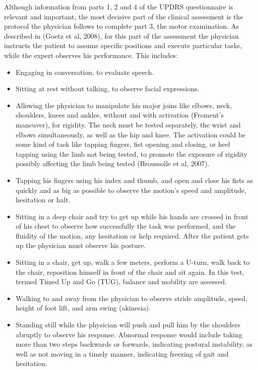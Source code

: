 Although information from parts 1, 2 and 4 of the U\gls{PD}RS questionnaire is relevant and important, the most decisive part of the clinical assessment is the protocol the physician follows to complete part 3, the motor examination. As described in (Goetz et al, 2008), for this part of the assessment the physician instructs the patient to assume specific positions and execute particular tasks, while the expert observes his performance. This includes:
\begin{itemize}
\item Engaging in conversation, to evaluate speech.
\item Sitting at rest without talking, to observe facial expressions.
\item Allowing the physician to manipulate his major joins like elbows, neck, shoulders, knees and ankles, without and with activation (Froment's maneuver), for rigidity. The neck must be tested separately, the wrist and elbows simultaneously, as well as the hip and knee. The activation could be some kind of task like tapping fingers, fist opening and closing, or heel tapping using the limb not being tested, to promote the exposure of rigidity possibly affecting the limb being tested (Broussolle et al, 2007). 
\item Tapping his fingers using his index and thumb, and open and close his fists as quickly and as big as possible to observe the motion's speed and amplitude, hesitation or halt. 
\item Sitting in a deep chair and try to get up while his hands are crossed in front of his chest to observe how successfully the task was performed, and the fluidity of the motion, any hesitation or help required. After the patient gets up the physician must observe his posture. 
\item Sitting in a chair, get up, walk a few meters, perform a U-turn, walk back to the chair, reposition himself in front of the chair and sit again. In this test, termed  Timed Up and Go (TUG), balance and mobility are assessed.
\item Walking to and away from the physician to observe stride amplitude, speed, height of foot lift, and arm swing (akinesia).
\item Standing still while the physician will push and pull him by the shoulders abruptly to observe his response. Abnormal response would include taking more than two steps backwards or forwards, indicating postural instability, as well as not moving in a timely manner, indicating freezing of gait and hesitation. 

\end{itemize}
